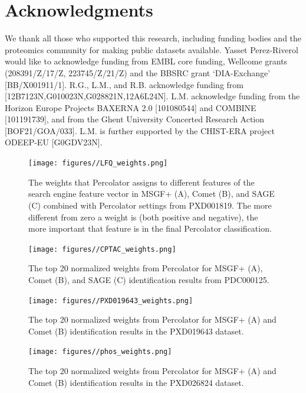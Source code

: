 \documentclass[12pt]{article}
\begin{document}
\section*{Acknowledgments}
We thank all those who supported this research, including funding bodies and the proteomics community for making public datasets available. 
Yasset Perez-Riverol would like to acknowledge funding from EMBL core funding, Wellcome grants (208391/Z/17/Z, 223745/Z/21/Z) and the BBSRC grant ‘DIA-Exchange’ [BB/X001911/1].
R.G., L.M., and R.B. acknowledge funding from [12B7123N,G010023N,G028821N,12A6L24N]. L.M. acknowledge funding from the Horizon Europe Projects BAXERNA 2.0 [101080544] and COMBINE [101191739], and from the Ghent University Concerted Research Action [BOF21/GOA/033]. L.M. is further supported by the CHIST-ERA project ODEEP-EU [G0GDV23N].



\renewcommand\thefigure{S\arabic{figure}}
\setcounter{figure}{0}

\begin{figure}[ht!]
	\centering
	\texttt{[image: figures//LFQ\_weights.png]}
	\caption{The weights that Percolator assigns to different features of the search engine feature vector in MSGF+ (A), Comet (B), and SAGE (C) combined with Percolator settings from PXD001819. The more different from zero a weight is (both positive and negative), the more important that feature is in the final Percolator classification.}
	\label{fig:PXD001819_svm_weights}
\end{figure}

\begin{figure}[ht!]
	\centering
	\texttt{[image: figures//CPTAC\_weights.png]}
	\caption{The top 20 normalized weights from Percolator for MSGF+ (A), Comet (B), and SAGE (C) identification results from PDC000125.}
	\label{fig:PDC_ms2rescore_weights}
\end{figure}

\begin{figure}[ht!]
	\centering
	\texttt{[image: figures//PXD019643\_weights.png]}
	\caption{The top 20 normalized weights from Percolator for MSGF+ (A) and Comet (B) identification results in the PXD019643 dataset.}
	\label{fig:PXD019643_features}
\end{figure}

\begin{figure}[ht!]
	\centering
	\texttt{[image: figures//phos\_weights.png]}
	\caption{The top 20 normalized weights from Percolator for MSGF+ (A) and Comet (B) identification results in the PXD026824 dataset.}
	\label{fig:phospho_features}
\end{figure}
\end{document}
